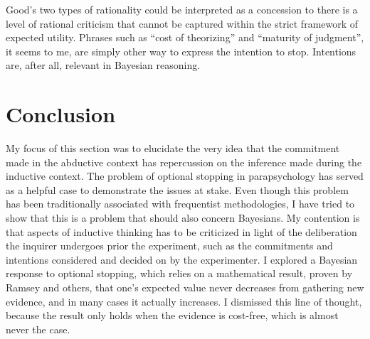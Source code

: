 Good's two types of rationality could be interpreted as a concession to
there is a level of rational criticism that cannot be captured within
the strict framework of expected utility. Phrases such as ``cost of
theorizing'' and ``maturity of judgment'', it seems to me, are simply
other way to express the intention to stop. Intentions are, after all,
relevant in Bayesian reasoning.

\section{Conclusion}\label{stoppingcon}

My focus of this section was to elucidate the very idea that the commitment made in the abductive context has  repercussion on the inference made during the inductive context. The problem of optional stopping in parapsychology has served as a helpful case to demonstrate the issues at stake. Even though this problem has been traditionally associated with frequentist methodologies, I have tried to show that this is a problem that should also concern Bayesians. My contention is that aspects of inductive thinking has to be criticized in light of the deliberation the inquirer undergoes prior the experiment, such as the commitments and intentions considered and decided on by the experimenter. I explored a Bayesian response to optional stopping, which relies on a mathematical result, proven by Ramsey and others, that one's expected value never decreases from gathering new evidence, and in many cases it actually increases. I dismissed this line of thought, because the result only holds when the evidence is cost-free, which is almost never the case.

 
